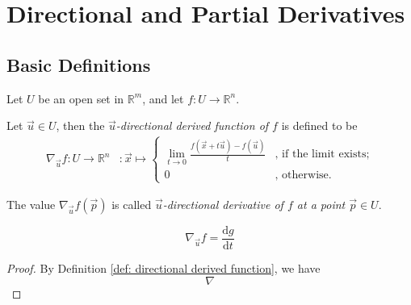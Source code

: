\chapter{Directional and Partial Derivatives}



\section{Basic Definitions}


\begin{definition}
	\label{def: directional derived function}
	Let $U$ be an open set in $\mathbb R^m$, and let $f: U \to \mathbb R^n$.

	Let $\vec u \in U$, then the \textit{$\vec u$-directional derived function of $f$} is defined to be
	$$
	\begin{aligned}
		\nabla_{\vec u} f : U \to \mathbb R^n
		&: \vec x \mapsto
		\begin{cases}
			\displaystyle \lim_{t \to 0} \frac{f(\vec x + t \vec u) - f(\vec u)}{t} & \text{, if the limit exists;} \\
			0 & \text{, otherwise.}
		\end{cases}
	\end{aligned}
	$$
	
	The value $\nabla_{\vec u} f(\vec p)$ is called \textit{$\vec u$-directional derivative of $f$ at a point $\vec p \in U$}.
\end{definition}


\begin{lemma}
	\label{lm: directional derivad function}
	$$
	\nabla_{\vec u} f = \frac{\mathrm d g}{\mathrm d t}
	$$
	
	\begin{proof}
		By Definition \ref{def: directional derived function}, we have
		$$
		\nabla
		$$
	\end{proof}
\end{lemma}



